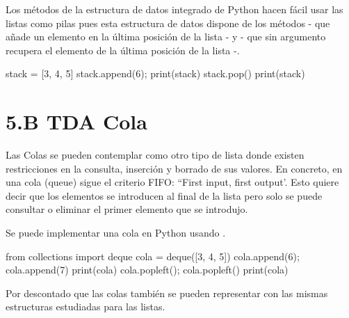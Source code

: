 Los métodos de la estructura de datos integrado  de Python hacen fácil usar las listas como pilas pues esta estructura de datos dispone de los métodos  - que añade un elemento en la última posición de la lista - y  - que sin argumento recupera el elemento de la última posición de la lista -.

\begin{pyconsole}[][frame=single]
stack = [3, 4, 5]
stack.append(6); 
print(stack)
stack.pop()
print(stack)
\end{pyconsole}






\section*{5.B TDA Cola}
\label{sec:Cola}



Las Colas se pueden contemplar como otro tipo de lista donde existen restricciones en la consulta, inserción y borrado de sus valores.
En concreto, en una  cola (queue) sigue el criterio FIFO: ``First input, first output'. Esto quiere decir que los elementos se introducen al final  de la lista pero solo se puede consultar o eliminar el primer elemento que se introdujo. 






Se puede implementar una cola en Python usando . 
\begin{pyconsole}[][frame=single]
from collections import deque
cola = deque([3, 4, 5])
cola.append(6); cola.append(7)
print(cola)
cola.popleft(); cola.popleft()
print(cola)
\end{pyconsole}
Por descontado que las colas también se pueden representar con las mismas estructuras estudiadas para las listas. 




